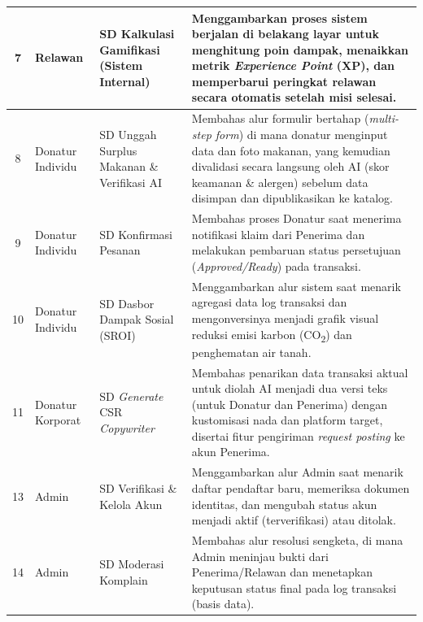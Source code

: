\begin{xltabular}{\textwidth}{|c|L|L|X|}
    7 & Relawan & SD Kalkulasi Gamifikasi (Sistem Internal) & Menggambarkan proses sistem berjalan di belakang layar untuk menghitung poin dampak, menaikkan metrik \textit{Experience Point} (XP), dan memperbarui peringkat relawan secara otomatis setelah misi selesai. \\
    \hline

    8 & Donatur Individu & SD Unggah Surplus Makanan \& Verifikasi AI & Membahas alur formulir bertahap (\textit{multi-step form}) di mana donatur menginput data dan foto makanan, yang kemudian divalidasi secara langsung oleh AI (skor keamanan \& alergen) sebelum data disimpan dan dipublikasikan ke katalog. \\
    \hline

    9 & Donatur Individu & SD Konfirmasi Pesanan & Membahas proses Donatur saat menerima notifikasi klaim dari Penerima dan melakukan pembaruan status persetujuan (\textit{Approved/Ready}) pada transaksi. \\
    \hline

    10 & Donatur Individu & SD Dasbor Dampak Sosial (SROI) & Menggambarkan alur sistem saat menarik agregasi data log transaksi dan mengonversinya menjadi grafik visual reduksi emisi karbon (CO\textsubscript{2}) dan penghematan air tanah. \\
    \hline

    11 & Donatur Korporat & SD \textit{Generate} CSR \textit{Copywriter} & Membahas penarikan data transaksi aktual untuk diolah AI menjadi dua versi teks (untuk Donatur dan Penerima) dengan kustomisasi nada dan platform target, disertai fitur pengiriman \textit{request posting} ke akun Penerima. \\
    \hline


    13 & Admin & SD Verifikasi \& Kelola Akun & Menggambarkan alur Admin saat menarik daftar pendaftar baru, memeriksa dokumen identitas, dan mengubah status akun menjadi aktif (terverifikasi) atau ditolak. \\
    \hline

    14 & Admin & SD Moderasi Komplain & Membahas alur resolusi sengketa, di mana Admin meninjau bukti dari Penerima/Relawan dan menetapkan keputusan status final pada log transaksi (basis data). \\
    \hline


\end{xltabular}

